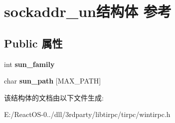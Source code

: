 \hypertarget{structsockaddr__un}{}\section{sockaddr\+\_\+un结构体 参考}
\label{structsockaddr__un}
\subsection*{Public 属性}
\begin{DoxyCompactItemize}
\item 
\mbox{\label{structsockaddr__un_a9f81cf9e2dcdf6a7d67472abda3afb6c}} 
int {\bfseries sun\+\_\+family}
\item 
\mbox{\label{structsockaddr__un_ac8f54f71e181e6e1e54ef5439a5d17e3}} 
char {\bfseries sun\+\_\+path} \mbox{[}M\+A\+X\+\_\+\+P\+A\+TH\mbox{]}
\end{DoxyCompactItemize}


该结构体的文档由以下文件生成\+:\begin{DoxyCompactItemize}
\item 
E\+:/\+React\+O\+S-\/0../dll/3rdparty/libtirpc/tirpc/wintirpc.\+h\end{DoxyCompactItemize}
